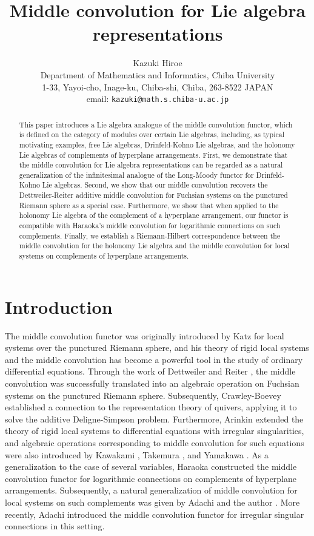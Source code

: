 \documentclass[a4paper,12pt]{article}
\title{Middle convolution for Lie algebra representations 
}
\date{}
\author{Kazuki Hiroe\\
Department of Mathematics and Informatics, Chiba University\\
1-33, Yayoi-cho, Inage-ku, Chiba-shi, Chiba, 263-8522 JAPAN\\
email: {\tt kazuki@math.s.chiba-u.ac.jp}
}
\theoremstyle{definition}
\theoremstyle{remark}
\begin{document}
\maketitle
\begin{abstract}
This paper introduces a Lie algebra analogue of the middle convolution functor, 
which is defined on the category of modules over certain Lie algebras, 
including, as typical motivating examples, free Lie algebras, Drinfeld-Kohno Lie algebras, 
and the holonomy Lie algebras of complements of hyperplane arrangements. 
First, we demonstrate that the middle convolution for Lie algebra representations can be regarded as 
a natural generalization of the infinitesimal analogue of the Long-Moody functor for Drinfeld-Kohno Lie algebras. 
Second, we show that our middle convolution recovers the Dettweiler-Reiter additive middle convolution 
for Fuchsian systems on the punctured Riemann sphere as a special case. 
Furthermore, we show that when applied to the holonomy Lie algebra of the complement of a hyperplane arrangement, 
our functor is compatible with Haraoka's middle convolution for logarithmic connections on such complements. 
Finally, we establish a Riemann-Hilbert correspondence between the middle convolution 
for the holonomy Lie algebra and the middle convolution for local systems on complements of hyperplane arrangements.
\end{abstract}
\tableofcontents
\section{Introduction}
The middle convolution functor was originally introduced by Katz \cite{Katz} for  
local systems over the punctured Riemann sphere, and 
his theory of rigid local systems and the middle convolution has become a powerful tool in the study of ordinary differential equations.
Through the work of Dettweiler and Reiter \cite{DR00,DR07}, 
the middle convolution was successfully translated into an algebraic operation 
on Fuchsian systems on the punctured Riemann sphere. 
Subsequently, Crawley-Boevey \cite{CB03} established a connection to 
the representation theory of quivers, applying it to solve the additive 
Deligne-Simpson problem. 
Furthermore, Arinkin \cite{Ari10} extended the theory of rigid local 
systems to differential equations with irregular singularities,
and algebraic operations corresponding to middle convolution for such equations were also introduced by 
Kawakami \cite{Kaw10}, Takemura \cite{Tak11}, and Yamakawa \cite{Yam11}.
As a generalization to the case of several variables, Haraoka \cite{Har1} 
constructed the middle convolution functor for logarithmic connections 
on complements of hyperplane arrangements. 
Subsequently, a natural generalization of middle convolution 
for local systems on such complements was given 
by Adachi and the author \cite{AdaHir}. 
More recently, Adachi \cite{Ada25} introduced the middle convolution functor 
for irregular singular connections in this setting.
\end{document}
